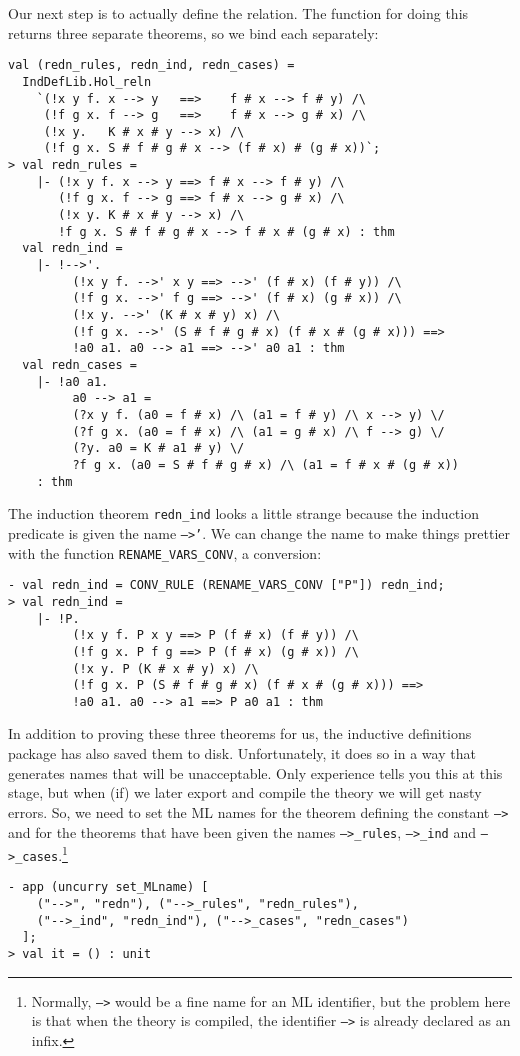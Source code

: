 \documentclass[12pt]{article}
\begin{document}
Our next step is to actually define the relation.  The function for
doing this returns three separate theorems, so we bind each
separately:
\begin{session}\begin{verbatim}
val (redn_rules, redn_ind, redn_cases) =
  IndDefLib.Hol_reln
    `(!x y f. x --> y   ==>    f # x --> f # y) /\
     (!f g x. f --> g   ==>    f # x --> g # x) /\
     (!x y.   K # x # y --> x) /\
     (!f g x. S # f # g # x --> (f # x) # (g # x))`;
> val redn_rules =
    |- (!x y f. x --> y ==> f # x --> f # y) /\
       (!f g x. f --> g ==> f # x --> g # x) /\
       (!x y. K # x # y --> x) /\
       !f g x. S # f # g # x --> f # x # (g # x) : thm
  val redn_ind =
    |- !-->'.
         (!x y f. -->' x y ==> -->' (f # x) (f # y)) /\
         (!f g x. -->' f g ==> -->' (f # x) (g # x)) /\
         (!x y. -->' (K # x # y) x) /\
         (!f g x. -->' (S # f # g # x) (f # x # (g # x))) ==>
         !a0 a1. a0 --> a1 ==> -->' a0 a1 : thm
  val redn_cases =
    |- !a0 a1.
         a0 --> a1 =
         (?x y f. (a0 = f # x) /\ (a1 = f # y) /\ x --> y) \/
         (?f g x. (a0 = f # x) /\ (a1 = g # x) /\ f --> g) \/
         (?y. a0 = K # a1 # y) \/
         ?f g x. (a0 = S # f # g # x) /\ (a1 = f # x # (g # x))
    : thm
\end{verbatim}\end{session}
    The induction theorem \texttt{redn\_ind} looks a little strange
    because the induction predicate is given the name \texttt{-->'}.
    We can change the name to make things prettier with the function
    \texttt{RENAME\_VARS\_CONV}, a conversion:
\begin{session}\begin{verbatim}
- val redn_ind = CONV_RULE (RENAME_VARS_CONV ["P"]) redn_ind;
> val redn_ind =
    |- !P.
         (!x y f. P x y ==> P (f # x) (f # y)) /\
         (!f g x. P f g ==> P (f # x) (g # x)) /\
         (!x y. P (K # x # y) x) /\
         (!f g x. P (S # f # g # x) (f # x # (g # x))) ==>
         !a0 a1. a0 --> a1 ==> P a0 a1 : thm
\end{verbatim}\end{session}
    In addition to proving these three theorems for us, the inductive
    definitions package has also saved them to disk.  Unfortunately,
    it does so in a way that generates names that will be
    unacceptable.  Only experience tells you this at this stage, but
    when (if) we later export and compile the theory we will get nasty
    errors.  So, we need to set the ML names for the theorem defining
    the constant \texttt{-->} and for the theorems that have been
    given the names \texttt{-->\_rules}, \texttt{-->\_ind} and
    \texttt{-->\_cases}.\footnote{Normally, \texttt{-->} would be a
      fine name for an ML identifier, but the problem here is that
      when the theory is compiled, the identifier \texttt{-->} is
      already declared as an infix.}
\begin{session}\begin{verbatim}
- app (uncurry set_MLname) [
    ("-->", "redn"), ("-->_rules", "redn_rules"),
    ("-->_ind", "redn_ind"), ("-->_cases", "redn_cases")
  ];
> val it = () : unit
\end{verbatim}\end{session}
\end{document}
